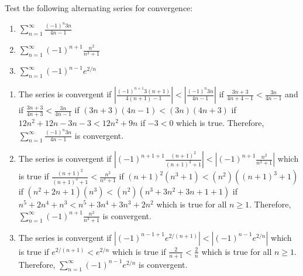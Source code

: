 \begin{Exercise}[label=alt1]
Test the following alternating series for convergence:
\begin{enumerate}
\item $\sum_{n=1}^\infty \frac{(-1)^n 3n}{4n-1}$
\item $\sum_{n=1}^\infty (-1)^{n+1} \frac{n^2}{n^3 + 1}$
\item $\sum_{n=1}^\infty (-1)^{n-1} e^{2/n}$
\end{enumerate}
\vspace{50mm}
\end{Exercise}

\begin{Answer}[ref = alt1]
\begin{enumerate}
\item The series is convergent if $\left| \frac{(-1)^{n+1} 3(n+1)}{4(n+1)-1} 
\right| < \left| \frac{(-1)^n 3n}{4n-1} \right|$ if $\frac{3n+3}{4n+4-1} < 
\frac{3n}{4n-1}$ and if $\frac{3n+3}{4n+3} < \frac{3n}{4n-1}$ if $(3n+3)(4n-1) 
< (3n)(4n+3)$ if $12n^2 + 12n - 3n - 3 < 12n^2 + 9n$ if $-3 < 0$ which is true. 
Therefore, $\sum_{n=1}^\infty \frac{(-1)^n 3n}{4n-1}$ is convergent. 
\item The series is convergent if $\left| (-1)^{n+1+1} \frac{(n+1)^2}{(n+1)^3 
+ 1} \right| < \left| (-1)^{n+1} \frac{n^2}{n^3 + 1} \right|$ which is true if 
$\frac{(n+1)^2}{(n+1)^3 + 1} < \frac{n^2}{n^3 + 1}$ if $(n+1)^2 (n^3 + 1) < 
(n^2) ((n+1)^3+1)$ if $(n^2 + 2n + 1)(n^3) < (n^2) (n^3 + 3n^2 + 3n + 1 + 1)$ 
if $n^5 + 2n^4 + n^3 < n^5 + 3n^4 + 3n^3 + 2n^2$ which is true for all $n \geq 
1$. Therefore, $\sum_{n=1}^\infty (-1)^{n+1} \frac{n^2}{n^3 + 1}$ is convergent.
\item The series is convergent if $\left| (-1)^{n-1+1} e^{2/(n+1)} \right| < 
\left| (-1)^{n - 1} e^{2/n} \right|$ which is true if $e^{2/(n+1)} < e^{2/n}$ 
which is true if $\frac{2}{n+1} < \frac{2}{n}$ which is true for all $n \geq 1$. 
Therefore, $\sum_{n=1}^\infty (-1)^{n-1} e^{2/n}$ is convergent. 
\end{enumerate}
\end{Answer}






